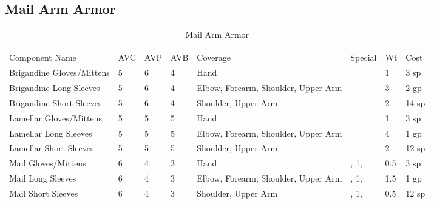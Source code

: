 \documentclass[oneside,11pt,english]{book}
\begin{document}
\subsection{Mail Arm Armor}
\begin{longtabu} to 
  \captionsetup{textformat=empty, labelformat=blank}
  \caption{Mail Arm Armor} \vspace{-15pt}
  \label{tab:Mail Arm Armor}\\
  Component Name&AVC&AVP&AVB& Coverage& Special& Wt&Cost\\\toprule
  Brigandine Gloves/Mittens& 5& 6& 4& Hand& & 1& 3 sp\\
  Brigandine Long Sleeves& 5& 6& 4& Elbow, Forearm, Shoulder, Upper Arm& & 3& 2 gp\\
  Brigandine Short Sleeves& 5& 6& 4& Shoulder, Upper Arm& & 2& 14 sp\\
  Lamellar Gloves/Mittens& 5& 5& 5& Hand& & 1& 3 sp\\
  Lamellar Long Sleeves& 5& 5& 5& Elbow, Forearm, Shoulder, Upper Arm& & 4& 1 gp\\
  Lamellar Short Sleeves& 5& 5& 5& Shoulder, Upper Arm& & 2& 12 sp\\
  Mail Gloves/Mittens& 6& 4& 3& Hand& ,  1, & 0.5& 3 sp\\
  Mail Long Sleeves& 6& 4& 3& Elbow, Forearm, Shoulder, Upper Arm& ,  1, & 1.5& 1 gp\\
  Mail Short Sleeves& 6& 4& 3& Shoulder, Upper Arm& ,  1, & 0.5& 12 sp\\
\end{longtabu}
\end{document}
